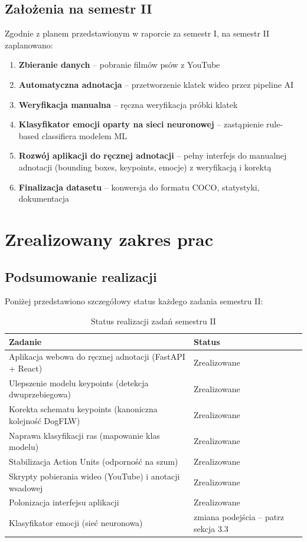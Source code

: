 \documentclass[11pt,a4paper]{article}
\newcommand{\done}{\textcolor{okgreen}{Zrealizowane}}
\begin{document}
\subsection{Założenia na semestr II}
Zgodnie z planem przedstawionym w raporcie za semestr I, na semestr II zaplanowano:
\begin{enumerate}[leftmargin=3.2em]
  \item \textbf{Zbieranie danych} -- pobranie filmów psów z YouTube
  \item \textbf{Automatyczna adnotacja} -- przetworzenie klatek wideo przez pipeline AI
  \item \textbf{Weryfikacja manualna} -- ręczna weryfikacja próbki klatek
  \item \textbf{Klasyfikator emocji oparty na sieci neuronowej} -- zastąpienie rule-based
        classifiera modelem ML
  \item \textbf{Rozwój aplikacji do ręcznej adnotacji} -- pełny interfejs do manualnej
        adnotacji (bounding boxes, keypoints, emocje) z weryfikacją i korektą
  \item \textbf{Finalizacja datasetu} -- konwersja do formatu COCO, statystyki, dokumentacja
\end{enumerate}

\section{Zrealizowany zakres prac}

\subsection{Podsumowanie realizacji}
Poniżej przedstawiono szczegółowy status każdego zadania semestru II:

\begin{table}[h!]
\centering
\begin{tabular}{p{8.2cm} l}
\toprule
\textbf{Zadanie} & \textbf{Status} \\
\midrule
Aplikacja webowa do ręcznej adnotacji (FastAPI + React) & \done \\
Ulepszenie modelu keypoints (detekcja dwuprzebiegowa) & \done \\
Korekta schematu keypoints (kanoniczna kolejność DogFLW) & \done \\
Naprawa klasyfikacji ras (mapowanie klas modelu) & \done \\
Stabilizacja Action Units (odporność na szum) & \done \\
Skrypty pobierania wideo (YouTube) i anotacji wsadowej & \done \\
Polonizacja interfejsu aplikacji & \done \\
Klasyfikator emocji (sieć neuronowa) & zmiana podejścia -- patrz sekcja 3.3 \\
\bottomrule
\end{tabular}
\caption{Status realizacji zadań semestru II}
\end{table}
\end{document}
